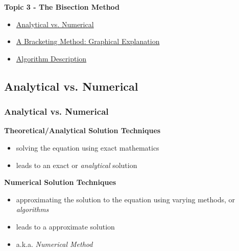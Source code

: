\documentclass[fleqn]{beamer} %
\newcommand{\sectionIIItitle}{The Bisection Method}
\newcommand{\sectionIIIsubsectionItitle}{Analytical vs. Numerical}
\newcommand{\sectionIIIsubsectionIItitle}{A Bracketing Method: Graphical Explanation}
\newcommand{\sectionIIIsubsectionIIItitle}{Algorithm Description}
\newcommand{\sectionIIIsubsectionIVtitle}{Programming Exercise}
\begin{document}
		\begin{frame}
			\large \textbf{Topic 3 - \sectionIIItitle} \vspace{3mm}\\

			\begin{itemize}
				\item \hyperlink{sectionIIIsubsectionI}{\sectionIIIsubsectionItitle} \vspc %
				\item \hyperlink{sectionIIIsubsectionII}{\sectionIIIsubsectionIItitle} \vspc %
				\item \hyperlink{sectionIIIsubsectionIII}{\sectionIIIsubsectionIIItitle} \vspc %
			\end{itemize}

		\end{frame}

		\subsection{\sectionIIIsubsectionItitle}\label{sectionIIIsubsectionI}

			\begin{frame}
				\frametitle{\sectionIIIsubsectionItitle}
				\bigskip

				\vspace{5mm}  	
				\textbf{ Theoretical/Analytical Solution Techniques }
				\begin{itemize}
					\item solving the equation using exact mathematics \\
					\item leads to an exact or {\it analytical} solution \\ 	\vspace{10mm}
				\end{itemize}
				\textbf{ Numerical Solution Techniques }		
				\begin{itemize}
					\item  approximating the solution to the equation using varying methods, or {\it algorithms}  \\
					\item leads to a approximate solution \\ 
					\item a.k.a. {\it Numerical Method}\vspace{20mm}
				\end{itemize}
					
				\btVFill
			\end{frame}
\end{document}
